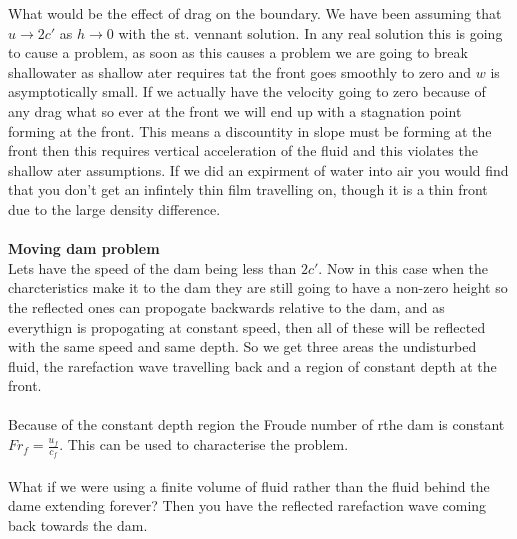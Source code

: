 \documentclass{article}
\begin{document}
What would be the effect of drag on the boundary. We have been assuming that $u \rightarrow 2 c'$  as $h \rightarrow 0$ with the st. vennant solution. In any real solution this is going to cause a problem, as soon as this causes a problem we are going to break shallowater as shallow ater requires tat the front goes smoothly to zero and $w$ is asymptotically small. If we actually have the velocity going to zero because of any drag what so ever at the front we will end up with a stagnation point forming at the front. This means a discountity in slope must be forming at the front then this requires vertical acceleration of the fluid and this violates the shallow ater assumptions. If we did an expirment of water into air you would find that you don't get an infintely thin film travelling on, though it is a thin front due to the large density difference.\\\\
\textbf{Moving dam problem}\\
Lets have the speed of the dam being less than $2 c'$. Now in this case when the charcteristics make it to the dam they are still going to have a non-zero height so the reflected ones can propogate backwards relative to the dam, and as everythign is propogating at constant speed, then all of these will be reflected with the same speed and same depth. So we get three areas the undisturbed fluid, the rarefaction wave travelling back and a region of constant depth at the front.\\\\
Because of the constant depth region the Froude number of rthe dam is constant $Fr_f = \frac{u_f}{c_f}$. This can be used to characterise the problem.\\\\
What if we were using a finite volume of fluid rather than the fluid behind the dame extending forever? Then you have the reflected rarefaction wave coming back towards the dam.
\end{document}
